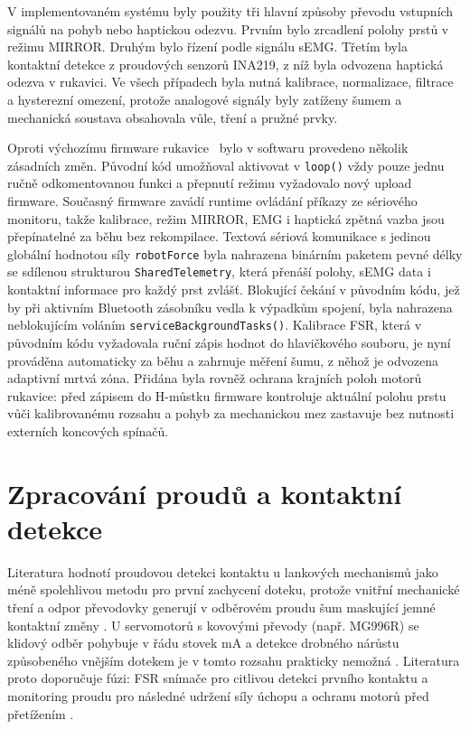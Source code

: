\documentclass[FZS,DP]{tulthesis}
\begin{document}
V implementovaném systému byly použity tři hlavní způsoby převodu vstupních signálů na pohyb nebo haptickou odezvu. Prvním bylo zrcadlení polohy prstů v režimu MIRROR\@. Druhým bylo řízení podle signálu sEMG\@. Třetím byla kontaktní detekce z proudových senzorů INA219, z níž byla odvozena haptická odezva v rukavici. Ve všech případech byla nutná kalibrace, normalizace, filtrace a hysterezní omezení, protože analogové signály byly zatíženy šumem a mechanická soustava obsahovala vůle, tření a pružné prvky.

Oproti výchozímu firmware rukavice~\cite{Curtis2021} bylo v softwaru provedeno několik zásadních změn. Původní kód umožňoval aktivovat v \texttt{loop()} vždy pouze jednu ručně odkomentovanou funkci a přepnutí režimu vyžadovalo nový upload firmware. Současný firmware zavádí runtime ovládání příkazy ze sériového monitoru, takže kalibrace, režim MIRROR, EMG i haptická zpětná vazba jsou přepínatelné za běhu bez rekompilace. Textová sériová komunikace s jedinou globální hodnotou síly \texttt{robotForce} byla nahrazena binárním paketem pevné délky se sdílenou strukturou \texttt{SharedTelemetry}, která přenáší polohy, sEMG data i kontaktní informace pro každý prst zvlášť. Blokující čekání v původním kódu, jež by při aktivním Bluetooth zásobníku vedla k výpadkům spojení, byla nahrazena neblokujícím voláním \texttt{serviceBackgroundTasks()}. Kalibrace FSR, která v původním kódu vyžadovala ruční zápis hodnot do hlavičkového souboru, je nyní prováděna automaticky za běhu a zahrnuje měření šumu, z něhož je odvozena adaptivní mrtvá zóna. Přidána byla rovněž ochrana krajních poloh motorů rukavice: před zápisem do H-můstku firmware kontroluje aktuální polohu prstu vůči kalibrovanému rozsahu a pohyb za mechanickou mez zastavuje bez nutnosti externích koncových spínačů.

\section{Zpracování proudů a kontaktní detekce}
\label{sec:kontaktova-detekce}

Literatura hodnotí proudovou detekci kontaktu u lankových mechanismů jako méně spolehlivou metodu pro první zachycení doteku, protože vnitřní mechanické tření a odpor převodovky generují v odběrovém proudu šum maskující jemné kontaktní změny \cite{Lebosse2011,Najman2017,Trajlinek2021}. U servomotorů s kovovými převody (např. MG996R) se klidový odběr pohybuje v řádu stovek mA a detekce drobného nárůstu způsobeného vnějším dotekem je v tomto rozsahu prakticky nemožná \cite{Lebosse2011,Najman2017}. Literatura proto doporučuje fúzi: FSR snímače pro citlivou detekci prvního kontaktu a monitoring proudu pro následné udržení síly úchopu a ochranu motorů před přetížením \cite{Mohammadi2024418,ti_ina219}.
\end{document}
